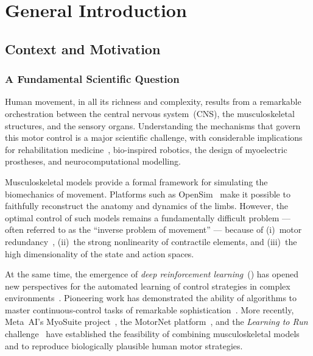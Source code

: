 \chapter{General Introduction}
\label{chap:intro}

\section{Context and Motivation}

\subsection{A Fundamental Scientific Question}

Human movement, in all its richness and complexity, results from a remarkable
orchestration between the central nervous system~(CNS), the musculoskeletal
structures, and the sensory organs. Understanding the mechanisms that govern this
motor control is a major scientific challenge, with considerable implications for
rehabilitation medicine~\parencite{Kwakkel2003}, bio-inspired robotics, the design of
myoelectric prostheses, and neurocomputational modelling.

Musculoskeletal models provide a formal framework for simulating the biomechanics of
movement. Platforms such as OpenSim~\parencite{Delp2007} make it possible to
faithfully reconstruct the anatomy and dynamics of the limbs. However, the optimal
control of such models remains a fundamentally difficult problem --- often referred to
as the ``inverse problem of movement'' --- because of (i)~motor
redundancy~\parencite{Zajac1989}, (ii)~the strong nonlinearity of contractile
elements, and (iii)~the high dimensionality of the state and action spaces.

At the same time, the emergence of \textit{deep reinforcement learning}~(\DRL{}) has
opened new perspectives for the automated learning of control strategies in complex
environments~\parencite{Mnih2015, Sutton2018}. Pioneering work has demonstrated the
ability of \DRL{} algorithms to master continuous-control tasks of remarkable
sophistication~\parencite{Lillicrap2016, Schulman2017, Haarnoja2018}. More recently,
Meta~AI's MyoSuite project~\parencite{Caggiano2022}, the
MotorNet platform~\parencite{Codol2023}, and the \textit{Learning to
Run} challenge~\parencite{Kidzinski2018} have established the feasibility of
combining musculoskeletal models and \DRL{} to reproduce biologically plausible human
motor strategies.

